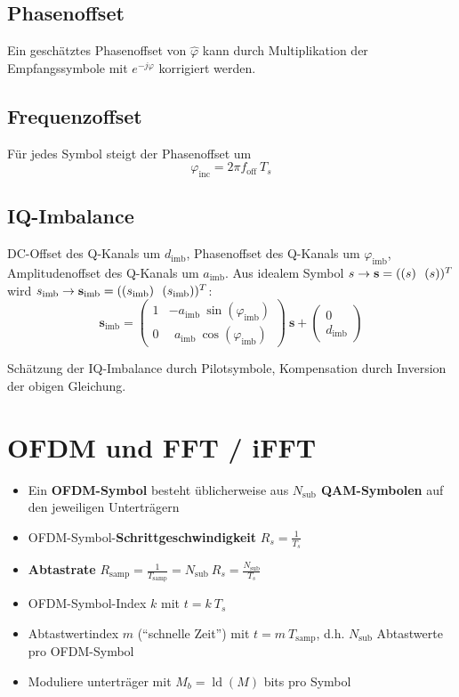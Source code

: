 \documentclass[a4paper, 11pt]{article}
\DeclareMathOperator{\ld}{ld}
\let\Re\relax
\let\Im\relax
\DeclareMathOperator{\Re}{Re}
\DeclareMathOperator{\Im}{Im}
\begin{document}
\subsection*{Phasenoffset}
Ein geschätztes Phasenoffset von $\hat \varphi$ kann durch Multiplikation der Empfangssymbole mit $e^{-j \varphi}$ korrigiert werden.

\subsection*{Frequenzoffset}
Für jedes Symbol steigt der Phasenoffset um
\[
	\varphi_{\mathrm{inc}} = 2 \pi f_{\mathrm{off}} ~ T_s
\]

\subsection*{IQ-Imbalance}
DC-Offset des Q-Kanals um $d_{\mathrm{imb}}$, Phasenoffset des Q-Kanals um $\varphi_{\mathrm{imb}}$, Amplitudenoffset des Q-Kanals um $a_{\mathrm{imb}}$. Aus idealem Symbol $s \rightarrow \mathbf s = (\Re(s) ~~ \Im(s))^T$ wird $s_{\mathrm{imb}} \rightarrow \mathbf s_{\mathrm{imb}} = (\Re(s_{\mathrm{imb}}) ~~ \Im(s_{\mathrm{imb}}))^T$:
\[
	\mathbf s_{\mathrm{imb}} = \begin{pmatrix}
		1 & -a_\mathrm{imb} ~ \sin(\varphi_\mathrm{imb}) \\
		0 & ~~ a_\mathrm{imb} ~ \cos(\varphi_\mathrm{imb})
	\end{pmatrix} ~ \mathbf s + \begin{pmatrix}
		0 \\
		d_\mathrm{imb}
	\end{pmatrix}
\]

Schätzung der IQ-Imbalance durch Pilotsymbole, Kompensation durch Inversion der obigen Gleichung.

\section*{OFDM und FFT / iFFT}
\begin{itemize}
\item Ein \textbf{OFDM-Symbol} besteht üblicherweise aus \textbf{$N_{\mathrm{sub}}$ QAM-Symbolen} auf den jeweiligen Unterträgern
\item OFDM-Symbol-\textbf{Schrittgeschwindigkeit} $R_s = \frac{1}{T_s}$
\item \textbf{Abtastrate} $R_{\mathrm{samp}} = \frac{1}{T_{\mathrm{samp}}} = N_{\mathrm{sub}} ~ R_s = \frac{N_{\mathrm{sub}}}{T_s}$
\item OFDM-Symbol-Index $k$ mit $t = k ~ T_s$
\item Abtastwertindex $m$ (``schnelle Zeit'') mit $t = m ~ T_{\mathrm{samp}}$, d.h. $N_{\mathrm{sub}}$ Abtastwerte pro OFDM-Symbol
\item Moduliere unterträger mit $M_b = \ld(M)$ bits pro Symbol
\end{itemize}
\end{document}
